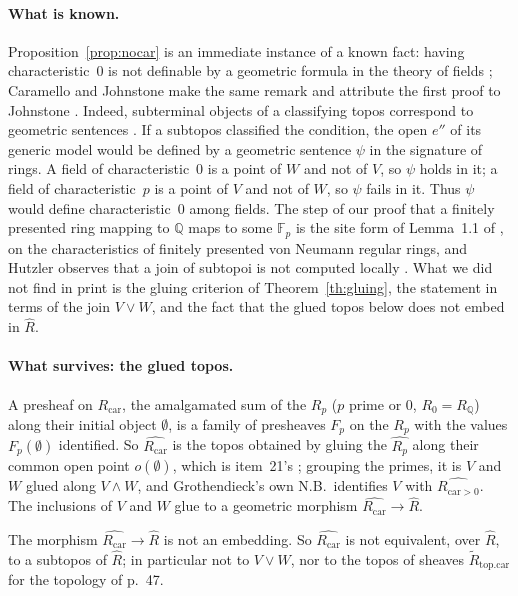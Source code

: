 \paragraph{What is known.} Proposition~\ref{prop:nocar} is an immediate instance of a known fact: having characteristic~$0$ is not definable by a geometric formula in the theory of fields \cite[\S8.2]{caramello-flat}; Caramello and Johnstone make the same remark and attribute the first proof to Johnstone \cite{caramello-johnstone}. Indeed, subterminal objects of a classifying topos correspond to geometric sentences \cite[\S7.1]{caramello-lattices}. If a subtopos classified the condition, the open $e''$ of its generic model would be defined by a geometric sentence $\psi$ in the signature of rings. A field of characteristic~$0$ is a point of $W$ and not of $V$, so $\psi$ holds in it; a field of characteristic~$p$ is a point of $V$ and not of $W$, so $\psi$ fails in it. Thus $\psi$ would define characteristic~$0$ among fields. The step of our proof that a finitely presented ring mapping to $\mathbb Q$ maps to some $\mathbb F_p$ is the site form of Lemma~1.1 of \cite{caramello-johnstone}, on the characteristics of finitely presented von Neumann regular rings, and Hutzler observes that a join of subtopoi is not computed locally \cite[Rem.~3.5.2]{hutzler}. What we did not find in print is the gluing criterion of Theorem~\ref{th:gluing}, the statement in terms of the join $V\vee W$, and the fact that the glued topos below does not embed in $\widehat R$.

\paragraph{What survives: the glued topos.} A presheaf on $R_{\mathrm{car}}$, the amalgamated sum of the $R_p$ ($p$ prime or $0$, $R_0 = R_{\mathbb Q}$) along their initial object $\emptyset$, is a family of presheaves $F_p$ on the $R_p$ with the values $F_p(\emptyset)$ identified. So $\widehat{R_{\mathrm{car}}}$ is the topos obtained by gluing the $\widehat{R_p}$ along their common open point $o(\emptyset)$, which is item~21's ; grouping the primes, it is $V$ and $W$ glued along $V\wedge W$, and Grothendieck's own N.B.\ identifies $V$ with $\widehat{R_{\mathrm{car}>0}}$. The inclusions of $V$ and $W$ glue to a geometric morphism $\widehat{R_{\mathrm{car}}}\to\widehat R$.

\begin{corollary}
The morphism $\widehat{R_{\mathrm{car}}}\to\widehat R$ is not an embedding. So $\widehat{R_{\mathrm{car}}}$ is not equivalent, over $\widehat R$, to a subtopos of $\widehat R$; in particular not to $V\vee W$, nor to the topos of sheaves $\widetilde R_{\mathrm{top.car}}$ for the topology  of p.~47.
\end{corollary}

